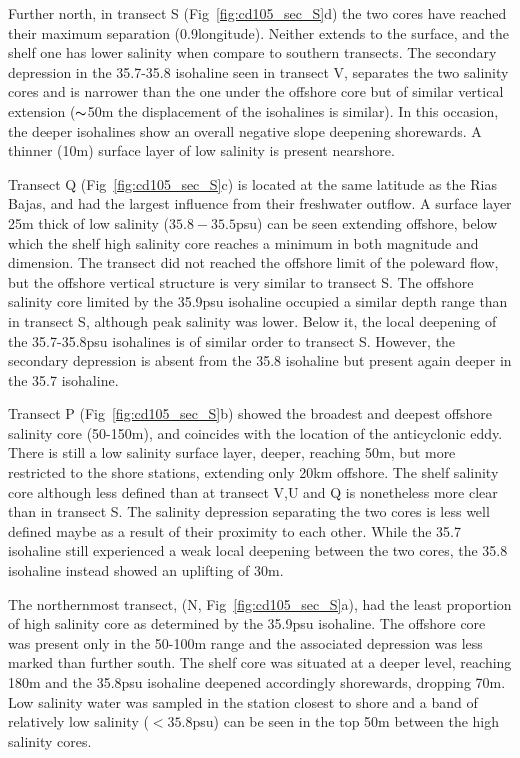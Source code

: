 Further north, in transect S (Fig~\ref{fig:cd105_sec_S}d) the two
cores have reached their maximum separation (0.9\deg longitude).
Neither extends to the surface, and the shelf one has lower
salinity when compare to southern transects. The secondary
depression in the 35.7-35.8 isohaline seen in transect V,
separates the two salinity cores and is narrower than the one
under the offshore core but of similar vertical extension
($\thicksim$50m the displacement of the isohalines is similar). In
this occasion, the deeper isohalines show an overall negative
slope deepening shorewards. A thinner (10m) surface layer of low
salinity is present nearshore.

Transect Q (Fig~\ref{fig:cd105_sec_S}c) is located at the same
latitude as the Rias Bajas, and had the largest influence from
their freshwater outflow. A surface layer 25m thick of low
salinity ($35.8-35.5$psu) can be seen extending offshore, below
which the shelf high salinity core reaches a minimum in both
magnitude and dimension. The transect did not reached the offshore
limit of the poleward flow, but the offshore vertical structure is
very similar to transect S. The offshore salinity core limited by
the 35.9psu isohaline occupied a similar depth range than in
transect S, although peak salinity was lower. Below it, the local
deepening of the 35.7-35.8psu isohalines is of similar order to
transect S. However, the secondary depression is absent from the
35.8 isohaline but present again deeper in the 35.7 isohaline.

Transect P (Fig~\ref{fig:cd105_sec_S}b) showed the broadest and
deepest offshore salinity core (50-150m), and coincides with the
location of the anticyclonic eddy. There is still a low salinity
surface layer, deeper, reaching 50m, but more restricted to the
shore stations, extending only 20km offshore. The shelf salinity
core although less defined than at transect V,U and Q is
nonetheless more clear than in transect S. The salinity depression
separating the two cores is less well defined maybe as a result of
their proximity to each other. While the 35.7 isohaline still
experienced a weak local deepening between the two cores, the 35.8
isohaline instead showed an uplifting of 30m.

The northernmost transect, (N, Fig~\ref{fig:cd105_sec_S}a), had
the least proportion of high salinity core as determined by the
35.9psu isohaline. The offshore core was present only in the
50-100m range and the associated depression was less marked than
further south. The shelf core was situated at a deeper level,
reaching 180m and the 35.8psu isohaline deepened accordingly
shorewards, dropping 70m. Low salinity water was sampled in the
station closest to shore and a band of relatively low salinity
($<35.8$psu) can be seen in the top 50m between the high salinity
cores.

